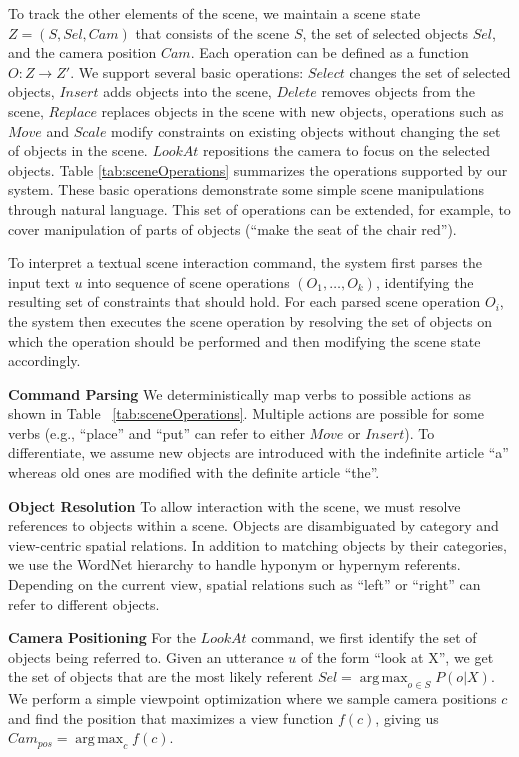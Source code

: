 \documentclass{sigchi}
\DeclareMathOperator*{\argmax}{arg\,max}
\begin{document}
To track the other elements of the scene, we maintain a scene state $Z = (S,\textit{Sel},\textit{Cam})$ that consists of the scene $S$, the set of selected objects $\textit{Sel}$, and the camera position $\textit{Cam}$.  Each operation can be defined as a function $O: Z \rightarrow Z'$.  We support several basic operations: $Select$ changes the set of selected objects, $Insert$ adds objects into the scene, $Delete$ removes objects from the scene, $Replace$ replaces objects in the scene with new objects, operations such as $Move$ and $Scale$ modify constraints on existing objects without changing the set of objects in the scene.  $LookAt$ repositions the camera to focus on the selected objects.  Table \ref{tab:sceneOperations} summarizes the operations supported by our system.  These basic operations demonstrate some simple scene manipulations through natural language.  This set of operations can be extended, for example, to cover manipulation of parts of objects (``make the seat of the chair red'').

To interpret a textual scene interaction command, the system first parses the input text $u$ into sequence of scene operations $(O_1,\ldots,O_k)$, identifying the resulting set of constraints that should hold.  For each parsed scene operation $O_i$, the system then executes the scene operation by resolving the set of objects on which the operation should be performed and then modifying the scene state accordingly.



\textbf{Command Parsing}
We deterministically map verbs to possible actions as shown in Table ~\ref{tab:sceneOperations}.  Multiple actions are possible for some verbs (e.g., ``place'' and ``put'' can refer to either $Move$ or $Insert$).  To differentiate, we assume new objects are introduced with the indefinite article ``a'' whereas old ones are modified with the definite article ``the''.


\textbf{Object Resolution}
To allow interaction with the scene, we must resolve references to objects within a scene.  Objects are disambiguated by category and view-centric spatial relations.  In addition to matching objects by their categories, we use the WordNet hierarchy to handle hyponym or hypernym referents.  Depending on the current view, spatial relations such as ``left'' or ``right'' can refer to different objects.

\textbf{Camera Positioning}
For the $LookAt$ command, we first identify the set of objects being referred to. Given an utterance $u$ of the form ``look at X'', we get the set of objects that are the most likely referent $Sel = \argmax_{o \in S} P(o|X)$.  We perform a simple viewpoint optimization where we sample camera positions $c$ and find the position that maximizes a view function $f(c)$, giving us $\textit{Cam}_\textit{pos} = \argmax_{c} f(c) $.
\end{document}
